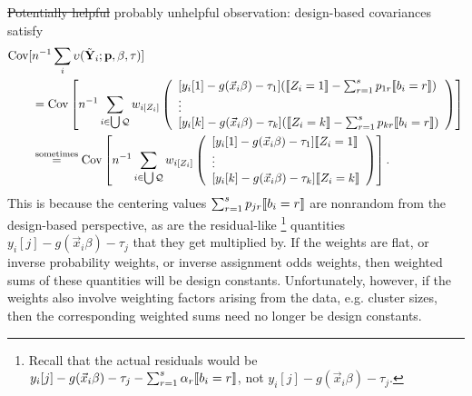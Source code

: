 \documentclass{article}
\DeclarePairedDelimiter{\indicator}{\llbracket}{\rrbracket}
\newcommand{\owt}[1][z_i]{\ensuremath{w_{i[#1]}}}
\begin{document}
\st{Potentially helpful} probably unhelpful observation:
design-based covariances satisfy
\begin{align*}
  \operatorname{Cov}[&n^{-1}\sum_{i}\upsilon(\tilde{\mathbf{Y}}_{i};
  \mathbf{p}, \beta, \tau)] \\
                     &=   \operatorname{Cov}\left[n^{-1}\sum_{i \in \bigcup \mathcal{Q}}
                       \owt[Z_{i}]
\left(
                                             \begin{array}{l}                                               
           [y_{i}[1]
                                               -
                                               g(\vec{x}_{i}\beta)-\tau_{1}](
                                               \indicator{Z_{i}=1} - \sum_{r=1}^{s}p_{1r}\indicator{b_{i}=r})\\
                  \vdots \\
{}           [y_{i}[k]
                                               - g(\vec{x}_{i}\beta) -
                                               \tau_{k}](\indicator{Z_{i}=k}
                                               - \sum_{r=1}^{s}p_{kr}\indicator{b_{i}=r})\\                                             \end{array}
\right) \right]\\
                     &\stackrel{\text{sometimes}}{=}  \operatorname{Cov}\left[n^{-1}\sum_{i \in \bigcup \mathcal{Q}}
\owt[Z_{i}]
\left(
                                             \begin{array}{l}                                               
           [y_{i}[1]
                                               -
                                               g(\vec{x}_{i}\beta)-\tau_{1}]
                                               \indicator{Z_{i}=1}\\
                  \vdots \\
{}           [y_{i}[k]
                                               - g(\vec{x}_{i}\beta) -
                                               \tau_{k}]\indicator{Z_{i}=k}\\                                             \end{array}
\right)
\right].
\end{align*}
This is because the centering values
$\sum_{r=1}^{s}p_{jr}\indicator{b_{i}=r}$ are nonrandom from the
design-based perspective, as are the residual-like%
\footnote{Recall that the actual residuals would be $y_{i}[j] -
  g(\vec{x}_{i}\beta) - \tau_{j} - \sum_{r=1}^{s}\alpha_{r}\indicator{b_{i}=r}$, not $y_{i}[j] - g(\vec{x}_{i}\beta) - \tau_{j}$.}
quantities
$y_{i}[j] - g(\vec{x}_{i}\beta) - \tau_{j}$ that they get
multiplied by.   If the weights are flat, or inverse probability
weights, or inverse assignment odds weights, then weighted sums of
these quantities will be design constants.  Unfortunately, however, if
the weights also involve weighting factors arising from the data,
e.g. cluster sizes, then the corresponding weighted sums need no
longer be design constants.
\end{document}
